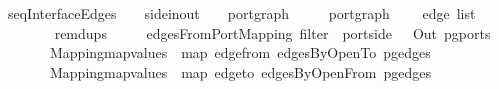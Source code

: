 \ seqInterfaceEdges\ {\isacharcolon}{\isacharcolon}\ {\isachardoublequoteopen}{\isacharparenleft}\ {\isacharcolon}{\isacharcolon}\ side{\isacharunderscore}in{\isacharunderscore}out{\isacharcomma}\ \ \ \ port{\isacharunderscore}graph\isanewline
{}\ {\isacharparenleft}\ \ \ \ port{\isacharunderscore}graph\isanewline
{}\ {\isacharparenleft}\ \ \ edge\ list{\isachardoublequoteclose}\isanewline
\ \ \ {\isachardoublequoteopen}\ \ {\isacharequal}\isanewline
\ \ remdups\isanewline
\ \ \ \ {\isacharparenleft}\ edgesFromPortMapping\ {\isacharparenleft}filter\ {\isacharparenleft}{\isasymlambda}\ port{\isachardot}side\ \ {\isacharequal}\ Out{\isacharparenright}\ {\isacharparenleft}pg{\isacharunderscore}ports\ \isanewline
\ \ \ \ \ \ {\isacharparenleft}\ Mapping{\isachardot}map{\isacharunderscore}values\ {\isacharparenleft}{\isasymlambda}\ map\ edge{\isacharunderscore}from{\isacharparenright}\ {\isacharparenleft}edgesByOpenTo\ {\isacharparenleft}pg{\isacharunderscore}edges\ \isanewline
\ \ \ \ \ \ {\isacharparenleft}\ Mapping{\isachardot}map{\isacharunderscore}values\ {\isacharparenleft}{\isasymlambda}\ map\ edge{\isacharunderscore}to{\isacharparenright}\ {\isacharparenleft}edgesByOpenFrom\ {\isacharparenleft}pg{\isacharunderscore}edges\ %
